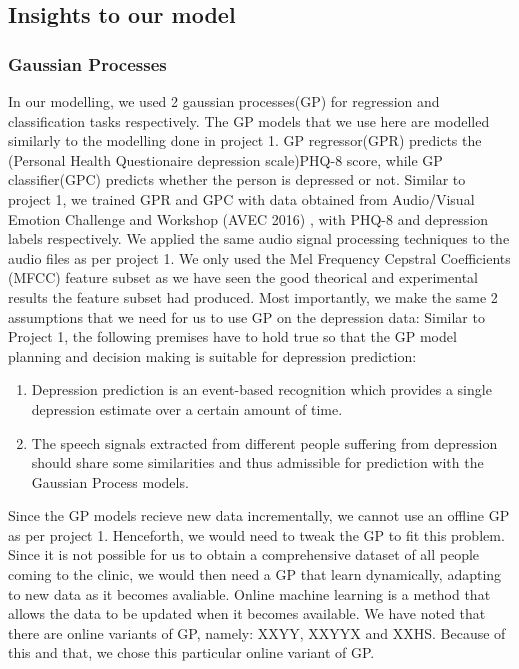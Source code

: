 \documentclass{article}
\begin{document}
	\subsection{Insights to our model}
	\subsubsection{Gaussian Processes} 
In our modelling, we used 2 gaussian processes(GP) for regression and classification tasks respectively. The GP models that we use here are modelled similarly to the modelling done in project 1. GP regressor(GPR) predicts the (Personal Health Questionaire depression scale)PHQ-8 score, while GP classifier(GPC) predicts whether the person is depressed or not. Similar to project 1, we trained GPR and GPC with data obtained from Audio/Visual Emotion Challenge and Workshop (AVEC 2016) \cite{avec2016}, with PHQ-8 and depression labels respectively. We applied the same audio signal processing techniques to the audio files as per project 1. We only used the Mel Frequency Cepstral Coefficients (MFCC) feature subset as we have seen the good theorical and experimental results the feature subset had produced. Most importantly, we make the same 2 assumptions that we need for us to use GP on the depression data: 
	Similar to Project 1, the following premises have to hold true so that the GP model planning and decision making is suitable for depression prediction:
	\begin{enumerate}
		\item Depression prediction is an event-based recognition which provides a single depression estimate over a certain amount of time. \cite{Valstar2016}
		\item The speech signals extracted from different people suffering from depression should share some similarities and thus admissible for prediction with the Gaussian Process models\cite{Cummins2015}.
	\end{enumerate}
Since the GP models recieve new data incrementally, we cannot use an offline GP as per project 1. Henceforth, we would need to tweak the GP to fit this problem. Since it is not possible for us to obtain a comprehensive dataset of all people coming to the clinic, we would then need a GP that learn dynamically, adapting to new data as it becomes avaliable. Online machine learning is a method that allows the data to be updated when it becomes available. We have noted that there are online variants of GP, namely: XXYY, XXYYX and XXHS. Because of this and that, we chose this particular online variant of GP. 
	
\end{document}
